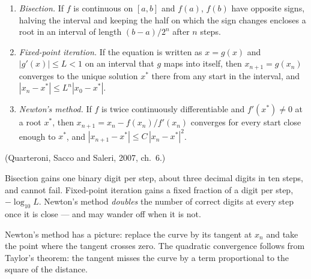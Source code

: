 \begin{theorem}
\label{thm:F-roots}
\begin{enumerate}[label=(\roman*)]
  \item \emph{Bisection.} If $f$ is continuous on $[a, b]$ and $f(a)$, $f(b)$ have opposite signs, halving the interval and keeping the half on which the sign changes encloses a root in an interval of length $(b - a)/2^n$ after $n$ steps.
  \item \emph{Fixed-point iteration.} If the equation is written as $x = g(x)$ and $|g'(x)| \le L < 1$ on an interval that $g$ maps into itself, then $x_{n+1} = g(x_n)$ converges to the unique solution $x^*$ there from any start in the interval, and $|x_n - x^*| \le L^n|x_0 - x^*|$.
  \item \emph{Newton's method.} If $f$ is twice continuously differentiable and $f'(x^*) \ne 0$ at a root $x^*$, then $x_{n+1} = x_n - f(x_n)/f'(x_n)$ converges for every start close enough to $x^*$, and $|x_{n+1} - x^*| \le C\,|x_n - x^*|^2$.
\end{enumerate}
(Quarteroni, Sacco and Saleri, 2007, ch.~6.)
\end{theorem}

Bisection gains one binary digit per step, about three decimal digits in ten steps, and cannot fail. Fixed-point iteration gains a fixed fraction of a digit per step, $-\log_{10}L$. Newton's method \emph{doubles} the number of correct digits at every step once it is close — and may wander off when it is not.

Newton's method has a picture: replace the curve by its tangent at $x_n$ and take the point where the tangent crosses zero. The quadratic convergence follows from Taylor's theorem: the tangent misses the curve by a term proportional to the square of the distance.

